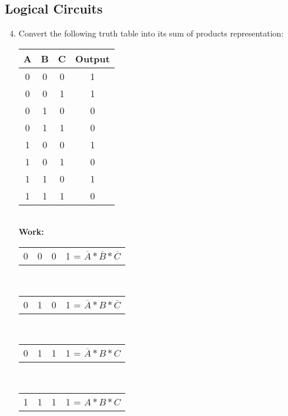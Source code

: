 \documentclass[11pt]{article}
\begin{document}
\subsection{Logical Circuits}
\begin{enumerate}
    \setcounter{enumi}{3}
    \item Convert the following truth table into its sum of products representation:\\
    \begin{tabular}{c c c | c}\\
            A & B & C & Output \\
        \hline
            0 & 0 & 0 & 1 \\
            0 & 0 & 1 & 1 \\
            0 & 1 & 0 & 0 \\
            0 & 1 & 1 & 0 \\
            1 & 0 & 0 & 1 \\
            1 & 0 & 1 & 0 \\
            1 & 1 & 0 & 1 \\
            1 & 1 & 1 & 0 \\
    \end{tabular}\\
    \textbf{Work:}
    \begin{center}
        \begin{tabular}{c c c | c}
            0 & 0 & 0 & 1  = $\overline{A} * \overline{B} * \overline{C}$\\
        \end{tabular}\\
        \begin{tabular}{c c c | c}\\
            0 & 1 & 0 & 1  = $\overline{A} * B * \overline{C}$\\
        \end{tabular}\\
        \begin{tabular}{c c c | c}\\
            0 & 1 & 1 & 1  = $\overline{A} * B * C$\\
        \end{tabular}\\
        \begin{tabular}{c c c | c}\\
            1 & 1 & 1 & 1  = $A * B * C$\\
        \end{tabular}\\

\end{center}
\end{enumerate}
\end{document}
